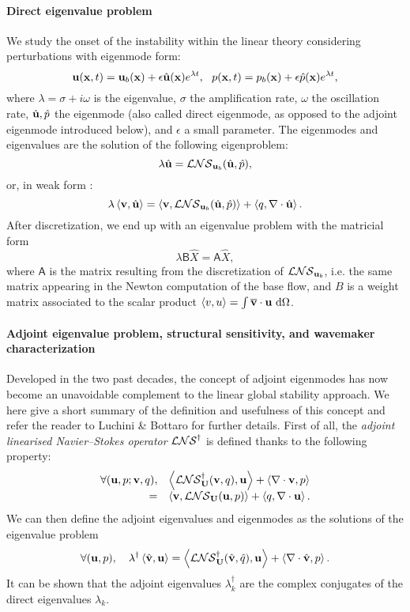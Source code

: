 \documentclass[twocolumn,10pt]{asme2ej}
\newcommand{\be}[1]{ \begin{equation} \label{#1}}
\newcommand{\ee}{\end{equation}}
\newcommand{\bes}[1]{ \begin{equation} \label{#1}\begin{array}{rl}}
\newcommand{\ees}{\end{array}\end{equation}}
\begin{document}
\paragraph{Direct eigenvalue problem}
We study the onset of the instability within the linear theory considering perturbations with eigenmode form:
\be{startmodepropre}
{\bf u} ({\bf{x}},t) = {\bf u}_b({\bf{x}}) + \epsilon \hat{\bf u}({\bf{x}}) e^{\lambda t}, \,\,\,\, {p}({\bf{x}},t) = {p}_b({\bf{x}}) + \epsilon \hat{p}({\bf{x}}) e^{\lambda t},
\ee
where $\lambda = \sigma + i \omega$ is the eigenvalue, $\sigma$ the amplification rate,
$\omega$ the oscillation rate, $\hat{{\bf u}},\hat{p}$ the eigenmode (also called direct eigenmode, as opposed to the adjoint eigenmode introduced below), 
and $\epsilon$ a small parameter. The eigenmodes and eigenvalues are the solution of the following eigenproblem:
 \be{LEP}
\lambda \hat{{\bf u}} = {\cal LNS}_{{\bf u}_b}( \hat{\bf u},\hat{p}),
\ee
or, in weak form : 
\be{eigenvalueproblem}
\lambda \left< {\bf v} , \hat{{\bf u}} \right> = \left< {\bf v}, {\cal LNS}_{{\bf u}_b} ( \hat{\bf u},\hat{p})\right> + \left< q, \nabla \cdot \hat{\bf u} \right>.
\ee
After discretization, we end up with an eigenvalue problem with the matricial form
\be{Eigen_matricial}
\lambda {\mathsf{B}} \hat{X} = {\mathsf{A}} \hat{X},
\ee
where ${\mathsf{A}}$ is the matrix resulting from the discretization of ${\cal LNS}_{{\bf u}_b}$, i.e. the same matrix  appearing in the Newton computation of the base flow, and  $B$ is a weight matrix associated to the scalar product $\left<v,u\right> = \int \overline{\bf v} \cdot {\bf u} \mbox{ d} \Omega$.

\paragraph{Adjoint eigenvalue problem, structural sensitivity, and wavemaker characterization}
Developed in the two past decades, the concept of adjoint eigenmodes has now become an unavoidable complement to the linear global stability approach. We here give a short summary of the definition and usefulness of this concept and refer the reader to Luchini \& Bottaro\cite{LucBott2014} for further details.
First of all, the {\em adjoint linearised Navier--Stokes operator} ${\cal LNS}^\dag$ is defined thanks to the following 
property:
\bes{NSLAdj}
\forall ( {\bf u}, p ; {\bf v}, q), & \left< {\cal LNS}^\dag_{\bf U}( {\bf v},q) ,{\bf u}\right> + \left< \nabla \cdot {\bf v},p\right>  \\
=& \left< {\bf v}, {\cal LNS}_{\bf U} ({\bf u},p)\right> + \left< q, \nabla \cdot {\bf u}\right>.
\ees
We can then define the adjoint eigenvalues and eigenmodes as the solutions of the eigenvalue problem 
\be{EigenAdj} 
\forall ( {\bf u}, p), \quad  \lambda^\dag \left< \hat{\bf v}, {\bf u}\right> =
 \left< {\cal LNS}^\dag_{\bf U}( \hat{\bf v},\hat{q}) ,{\bf u}\right> + \left< \nabla \cdot \hat{\bf v},p\right> . 
\ee
It can be shown \cite{SchmidHenningson2001} that the adjoint eigenvalues $\lambda^\dag_k$ are the complex conjugates of the direct eigenvalues $\lambda_k$. 
\end{document}
